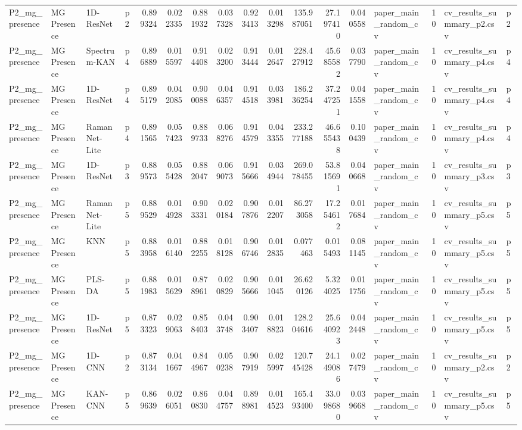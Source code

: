 \begin{tabular}{llllrrrrrrrrrlrll}
P2_mg_presence & MG Presence & 1D-ResNet & p2 & 0.899324 & 0.022335 & 0.881932 & 0.037328 & 0.923413 & 0.013298 & 135.987051 & 27.197410 & 0.040558 & paper_main_random_cv & 10 & cv_results_summary_p2.csv & p2 \\
P2_mg_presence & MG Presence & Spectrum-KAN & p4 & 0.896889 & 0.015597 & 0.914408 & 0.023200 & 0.913444 & 0.012647 & 228.427912 & 45.685582 & 0.037790 & paper_main_random_cv & 10 & cv_results_summary_p4.csv & p4 \\
P2_mg_presence & MG Presence & 1D-ResNet & p4 & 0.895179 & 0.042085 & 0.900088 & 0.046357 & 0.914518 & 0.033981 & 186.236254 & 37.247251 & 0.041558 & paper_main_random_cv & 10 & cv_results_summary_p4.csv & p4 \\
P2_mg_presence & MG Presence & RamanNet-Lite & p4 & 0.891565 & 0.057423 & 0.889733 & 0.068276 & 0.914579 & 0.043355 & 233.277188 & 46.655438 & 0.100439 & paper_main_random_cv & 10 & cv_results_summary_p4.csv & p4 \\
P2_mg_presence & MG Presence & 1D-ResNet & p3 & 0.889573 & 0.055428 & 0.882047 & 0.069073 & 0.915666 & 0.034944 & 269.078455 & 53.815691 & 0.040668 & paper_main_random_cv & 10 & cv_results_summary_p3.csv & p3 \\
P2_mg_presence & MG Presence & RamanNet-Lite & p5 & 0.889529 & 0.014928 & 0.903331 & 0.020184 & 0.907876 & 0.012207 & 86.273058 & 17.254612 & 0.017684 & paper_main_random_cv & 10 & cv_results_summary_p5.csv & p5 \\
P2_mg_presence & MG Presence & KNN & p5 & 0.883958 & 0.016140 & 0.882255 & 0.018128 & 0.906746 & 0.012835 & 0.077463 & 0.015493 & 0.081145 & paper_main_random_cv & 10 & cv_results_summary_p5.csv & p5 \\
P2_mg_presence & MG Presence & PLS-DA & p5 & 0.881983 & 0.015629 & 0.878961 & 0.020829 & 0.905666 & 0.011045 & 26.620126 & 5.324025 & 0.011756 & paper_main_random_cv & 10 & cv_results_summary_p5.csv & p5 \\
P2_mg_presence & MG Presence & 1D-ResNet & p5 & 0.873323 & 0.029063 & 0.858403 & 0.043748 & 0.903407 & 0.018823 & 128.204616 & 25.640923 & 0.042448 & paper_main_random_cv & 10 & cv_results_summary_p5.csv & p5 \\
P2_mg_presence & MG Presence & 1D-CNN & p2 & 0.873134 & 0.041667 & 0.844967 & 0.050238 & 0.907919 & 0.025997 & 120.745428 & 24.149086 & 0.027479 & paper_main_random_cv & 10 & cv_results_summary_p2.csv & p2 \\
P2_mg_presence & MG Presence & KAN-CNN & p5 & 0.869639 & 0.026051 & 0.860830 & 0.044757 & 0.898981 & 0.014523 & 165.493400 & 33.098680 & 0.039668 & paper_main_random_cv & 10 & cv_results_summary_p5.csv & p5 \\

\end{tabular}
